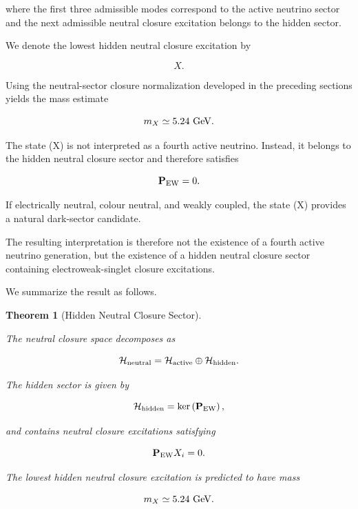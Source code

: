 \documentclass[11pt]{article}
\newtheorem{theorem}{Theorem}[section]
\theoremstyle{definition}
\theoremstyle{remark}
\begin{document}
where the first three admissible modes correspond to the active
neutrino sector and the next admissible neutral closure
excitation belongs to the hidden sector.

We denote the lowest hidden neutral closure excitation by

\begin{equation}
X.
\end{equation}

Using the neutral-sector closure normalization developed in the
preceding sections yields the mass estimate

\begin{equation}
m_X
\simeq
5.24~{\rm GeV}.
\label{eq:mx_prediction}
\end{equation}

The state (X) is not interpreted as a fourth active neutrino.
Instead, it belongs to the hidden neutral closure sector and
therefore satisfies

\begin{equation}
\mathbf P_{\rm EW} =
0.
\end{equation}

If electrically neutral, colour neutral, and weakly coupled,
the state (X) provides a natural dark-sector candidate.

The resulting interpretation is therefore not the existence of
a fourth active neutrino generation, but the existence of a
hidden neutral closure sector containing electroweak-singlet
closure excitations.

We summarize the result as follows.

\begin{theorem}[Hidden Neutral Closure Sector]
\label{thm:hidden_neutral_sector}

The neutral closure space decomposes as

\begin{equation}
\mathcal H_{\rm neutral} = 
\mathcal H_{\rm active}
\oplus
\mathcal H_{\rm hidden}.
\end{equation}

The hidden sector is given by

\begin{equation}
\mathcal H_{\rm hidden} =
\ker
\left(
\mathbf P_{\rm EW}
\right),
\end{equation}

and contains neutral closure excitations satisfying

\begin{equation}
\mathbf P_{\rm EW}X_i =
0.
\end{equation}

The lowest hidden neutral closure excitation is predicted to
have mass

\begin{equation}
m_X
\simeq
5.24~{\rm GeV}.
\end{equation}

\end{theorem}
\end{document}
